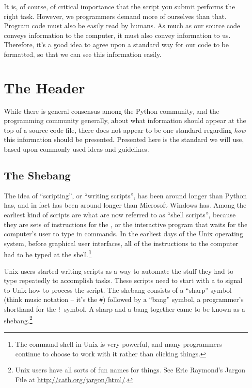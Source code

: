 It is, of course, of critical importance that the script you submit performs the right task.  However, we programmers demand more of ourselves than that.  Program code must also be easily read by humans.  As much as our source code conveys information to the computer, it must also convey information to us.  Therefore, it's a good idea to agree upon a standard way for our code to be formatted, so that we can see this information easily.

\section{The Header}
\label{sec:header}

While there is general consensus among the Python community, and the programming community generally, about what information should appear at the top of a source code file, there does not appear to be one standard regarding \textit{how} this information should be presented.  Presented here is the standard we will use, based upon commonly-used ideas and guidelines.

\subsection{The Shebang}
\label{sec:shebang}

The idea of ``scripting'', or ``writing scripts'', has been around longer than Python has, and in fact has been around longer than Microsoft Windows has.  Among the earliest kind of scripts are what are now referred to as ``shell scripts'', because they are sets of instructions for the , or the interactive program that waits for the computer's user to type in commands.  In the earliest days of the Unix operating system, before graphical user interfaces, all of the instructions to the computer had to be typed at the shell.\footnote{The command shell in Unix is very powerful, and many programmers continue to choose to work with it rather than clicking things.}

 Unix users started writing scripts as a way to automate the stuff they had to type repeatedly to accomplish tasks.  These scripts need to start with a  to signal to Unix how to process the script.  The shebang consists of a ``sharp'' symbol (think music notation -- it's the \texttt{\#}) followed by a ``bang'' symbol, a programmer's shorthand for the \texttt{!} symbol.  A sharp and a bang together came to be known as a shebang.\footnote{Unix users have all sorts of fun names for things.  See Eric Raymond's Jargon File at \url{http://catb.org/jargon/html/}.}

